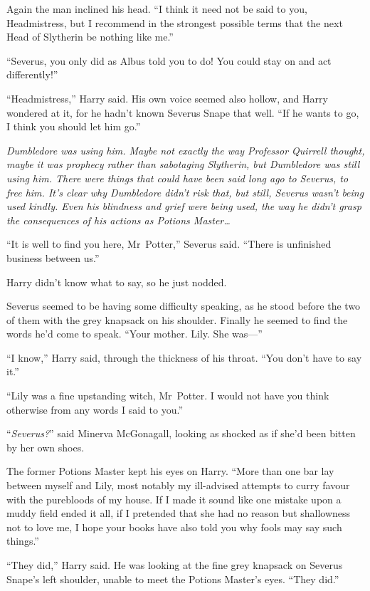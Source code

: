 Again the man inclined his head.
“I think it need not be said to you, Headmistress, but I recommend in the strongest possible terms that the next Head of Slytherin be nothing like me.”

“Severus, you only did as Albus told you to do! You could stay on and act differently!”

“Headmistress,” Harry said. His own voice seemed also hollow, and Harry wondered at it, for he hadn’t known Severus Snape that well.
“If he wants to go, I think you should let him go.”

\emph{Dumbledore was using him. Maybe not exactly the way Professor Quirrell thought, maybe it was prophecy rather than sabotaging Slytherin, but Dumbledore was still using him. There were things that could have been said long ago to Severus, to free him. It’s clear why Dumbledore didn’t risk that, but still, Severus wasn’t being used kindly. Even his blindness and grief were being used, the way he didn’t grasp the consequences of his actions as Potions Master…}

“It is well to find you here, Mr~Potter,” Severus said.
“There is unfinished business between us.”

Harry didn’t know what to say, so he just nodded.

Severus seemed to be having some difficulty speaking, as he stood before the two of them with the grey knapsack on his shoulder. Finally he seemed to find the words he’d come to speak.
“Your mother. Lily. She was—”

“I know,” Harry said, through the thickness of his throat.
“You don’t have to say it.”

“Lily was a fine upstanding witch, Mr~Potter. I would not have you think otherwise from any words I said to you.”

“\emph{Severus?}” said Minerva McGonagall, looking as shocked as if she’d been bitten by her own shoes.

The former Potions Master kept his eyes on Harry.
“More than one bar lay between myself and Lily, most notably my ill-advised attempts to curry favour with the purebloods of my house. If I made it sound like one mistake upon a muddy field ended it all, if I pretended that she had no reason but shallowness not to love me, I hope your books have also told you why fools may say such things.”

“They did,” Harry said. He was looking at the fine grey knapsack on Severus Snape’s left shoulder, unable to meet the Potions Master’s eyes.
“They did.”

